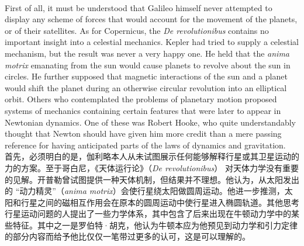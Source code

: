 \documentclass{article}
\begin{document}
\\
First of all, it must be understood that Galileo himself never attempted to display any scheme of forces that would account for the movement of the planets, or of their satellites. As for Copernicus, the \textit{De revolutionibus} contains no important insight into a celestial mechanics. Kepler had tried to supply a celestial mechanism, but the result was never a very happy one. He held that the \textit{anima motrix} emanating from the sun would cause planets to revolve about the sun in circles. He further supposed that magnetic interactions of the sun and a planet would shift the planet during an otherwise circular revolution into an elliptical orbit. Others who contemplated the problems of planetary motion proposed systems of mechanics containing certain features that were later to appear in Newtonian dynamics. One of these was Robert Hooke, who quite understandably thought that Newton should have given him more credit than a mere passing reference for having anticipated parts of the laws of dynamics and gravitation.\\
首先，必须明白的是，伽利略本人从未试图展示任何能够解释行星或其卫星运动的力的方案。至于哥白尼，《天体运行论》（\textit{De revolutionibus}） 对天体力学没有重要的见解。开普勒曾试图提供一种天体机制，但结果并不理想。他认为，从太阳发出的 “动力精灵”（\textit{anima motrix}）会使行星绕太阳做圆周运动。他进一步推测，太阳和行星之间的磁相互作用会在原本的圆周运动中使行星进入椭圆轨道。其他思考行星运动问题的人提出了一些力学体系，其中包含了后来出现在牛顿动力学中的某些特征。其中之一是罗伯特·胡克，他认为牛顿本应为他预见到动力学和引力定律的部分内容而给予他比仅仅一笔带过更多的认可，这是可以理解的。\\
\end{document}
